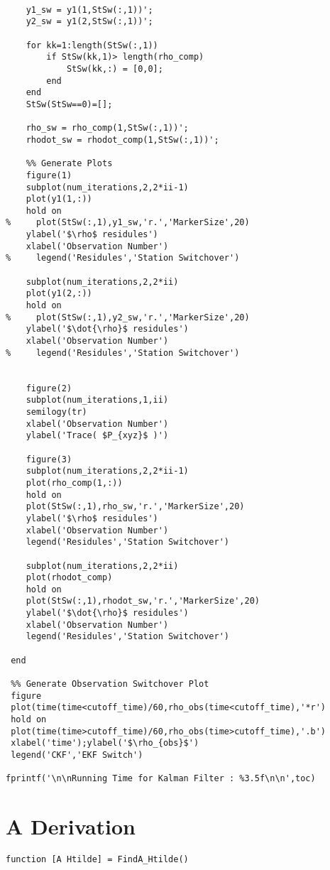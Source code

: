 \documentclass[12pt,a4paper,oneside]{article}
\numberwithin{equation}{section}   		%
\begin{document}
\begin{appendices}
\begin{lstlisting}
    
    y1_sw = y1(1,StSw(:,1))';
    y2_sw = y1(2,StSw(:,1))';
    
    for kk=1:length(StSw(:,1))
        if StSw(kk,1)> length(rho_comp)
            StSw(kk,:) = [0,0];
        end
    end
    StSw(StSw==0)=[];
    
    rho_sw = rho_comp(1,StSw(:,1))';
    rhodot_sw = rhodot_comp(1,StSw(:,1))';
    
    %% Generate Plots 
    figure(1)
    subplot(num_iterations,2,2*ii-1)
    plot(y1(1,:))
    hold on
%     plot(StSw(:,1),y1_sw,'r.','MarkerSize',20)
    ylabel('$\rho$ residules')
    xlabel('Observation Number')
%     legend('Residules','Station Switchover')
    
    subplot(num_iterations,2,2*ii)
    plot(y1(2,:))
    hold on
%     plot(StSw(:,1),y2_sw,'r.','MarkerSize',20)
    ylabel('$\dot{\rho}$ residules')
    xlabel('Observation Number')
%     legend('Residules','Station Switchover')
    
    
    figure(2)
    subplot(num_iterations,1,ii)
    semilogy(tr)
    xlabel('Observation Number')
    ylabel('Trace( $P_{xyz}$ )')
    
    figure(3)
    subplot(num_iterations,2,2*ii-1)
    plot(rho_comp(1,:))
    hold on
    plot(StSw(:,1),rho_sw,'r.','MarkerSize',20)
    ylabel('$\rho$ residules')
    xlabel('Observation Number')
    legend('Residules','Station Switchover')
    
    subplot(num_iterations,2,2*ii)
    plot(rhodot_comp)
    hold on
    plot(StSw(:,1),rhodot_sw,'r.','MarkerSize',20)
    ylabel('$\dot{\rho}$ residules')
    xlabel('Observation Number')
    legend('Residules','Station Switchover')
    
 end
 
 %% Generate Observation Switchover Plot
 figure
 plot(time(time<cutoff_time)/60,rho_obs(time<cutoff_time),'*r')
 hold on
 plot(time(time>cutoff_time)/60,rho_obs(time>cutoff_time),'.b')
 xlabel('time');ylabel('$\rho_{obs}$')
 legend('CKF','EKF Switch')

fprintf('\n\nRunning Time for Kalman Filter : %3.5f\n\n',toc)
\end{lstlisting}



\chapter{A Derivation}
\label{app:A Htilde}

\begin{lstlisting}
function [A Htilde] = FindA_Htilde()


\end{lstlisting}
\end{appendices}
\end{document}
